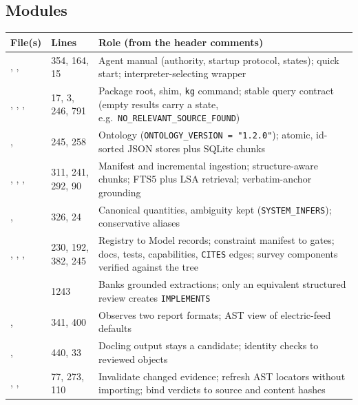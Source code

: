 \subsection{Modules}
{\chelevenTables
\begin{longtable}{P{6.4cm}P{1.7cm}P{7.6cm}}
\toprule
File(s) & Lines & Role (from the header comments) \\
\midrule\endhead
{}, ,  & 354, 164, 15 & Agent manual (authority, startup protocol, states); quick start; interpreter-selecting wrapper \\
, , ,  & 17, 3, 246, 791 & Package root, shim, \texttt{kg} command; stable query contract (empty results carry a state, e.g.\ \texttt{NO\_RELEVANT\_SOURCE\_FOUND}) \\
,  & 245, 258 & Ontology (\texttt{ONTOLOGY\_VERSION = "1.2.0"}); atomic, id-sorted JSON stores plus SQLite chunks \\
, , ,  & 311, 241, 292, 90 & Manifest and incremental ingestion; structure-aware chunks; FTS5 plus LSA retrieval; verbatim-anchor grounding \\
,  & 326, 24 & Canonical quantities, ambiguity kept (\texttt{SYSTEM\_INFERS}); conservative aliases \\
, , ,  & 230, 192, 382, 245 & Registry to Model records; constraint manifest to gates; docs, tests, capabilities, \texttt{CITES} edges; survey components verified against the tree \\
 & 1243 & Banks grounded extractions; only an equivalent structured review creates \texttt{IMPLEMENTS} \\
,  & 341, 400 & Observes two  report formats; AST view of electric-feed defaults \\
,  & 440, 33 & Docling output stays a candidate; identity checks to reviewed objects \\
, ,  & 77, 273, 110 & Invalidate changed evidence; refresh AST locators without importing; bind verdicts to source and content hashes \\

\end{longtable}}
